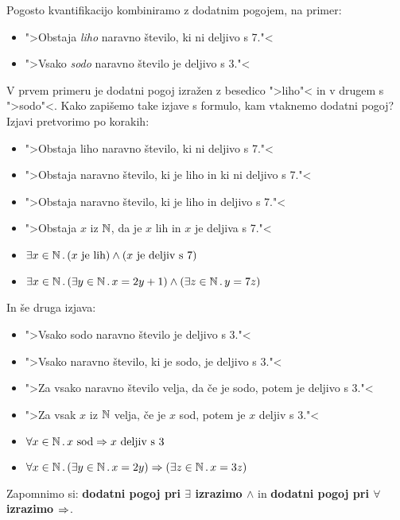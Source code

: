 Pogosto kvantifikacijo kombiniramo z dodatnim pogojem, na primer:
%
\begin{itemize}
\item ">Obstaja \emph{liho} naravno število, ki ni deljivo s 7."<
\item ">Vsako \emph{sodo} naravno število je deljivo s 3."<
\end{itemize}
%
V prvem primeru je dodatni pogoj izražen z besedico ">liho"< in v drugem s ">sodo"<. Kako zapišemo take izjave s formulo, kam
vtaknemo dodatni pogoj? Izjavi pretvorimo po korakih:
%
\begin{itemize}
\item ">Obstaja liho naravno število, ki ni deljivo s 7."<
\item ">Obstaja naravno število, ki je liho in ki ni deljivo s 7."<
\item ">Obstaja naravno število, ki je liho in deljivo s 7."<
\item ">Obstaja $x$ iz $\mathbb{N}$, da je $x$ lih in $x$ je deljiva s 7."<
\item $\exists x \in \mathbb{N} \,.\, (\text{$x$ je lih}) \land (\text{$x$ je deljiv s 7})$
\item $\exists x \in \mathbb{N} \,.\, (\exists y \in \mathbb{N} \,.\, x = 2 y + 1) \land (\exists z \in \mathbb{N} \,.\, y = 7 z)$
\end{itemize}
%
In še druga izjava:
\begin{itemize}
\item ">Vsako sodo naravno število je deljivo s 3."<
\item ">Vsako naravno število, ki je sodo, je deljivo s 3."<
\item ">Za vsako naravno število velja, da če je sodo, potem je deljivo s 3."<
\item ">Za vsak $x$ iz $\mathbb{N}$ velja, če je $x$ sod, potem je $x$ deljiv s $3$."<
\item $\forall x \in \mathbb{N} \,.\, \text{$x$ sod} \Rightarrow \text{$x$ deljiv s 3}$
\item $\forall x \in \mathbb{N} \,.\, (\exists y \in \mathbb{N} \,.\, x = 2 y) \Rightarrow (\exists z \in \mathbb{N} \,.\, x = 3 z)$
\end{itemize}
%
Zapomnimo si: \textbf{dodatni pogoj pri $\exists$ izrazimo $\land$} in \textbf{dodatni pogoj pri $\forall$ izrazimo $\Rightarrow$}.

